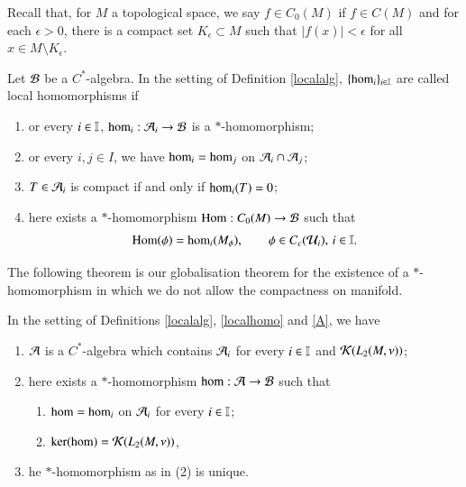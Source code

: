 \documentclass[leqno]{amsart}
\begin{document}
	Recall that, for $M$ a topological space, we say $f\in C_0(M)$ if $f\in C(M)$ and for each $\epsilon>0$, there is a compact set $K_{\epsilon}\subset M$ such that $|f(x)|<\epsilon$ for all $x\in M\setminus K_{\epsilon}$.
	
	\begin{definition}\label{localhomo}
		Let ${\mathcal B}$ be a $C^*$-algebra. In the setting of Definition \ref{localalg}, $\{{\rm hom}_i\}_{i\in\mathbb I}$ are called local homomorphisms if
		\begin{enumerate}[\rm(1)]
			\item {}or every $i\in\mathbb I$, ${\rm hom}_i:{\mathcal A}_i\to {\mathcal B}$ is a $*$-homomorphism;
			\item {}or every $i,j\in I$, we have ${\rm hom}_i={\rm hom}_j$ on ${\mathcal A}_i\cap{\mathcal A}_j$;
			\item $T\in{\mathcal A}_i$ is compact if and only if ${\rm hom}_i(T)=0$;
			\item {}here exists a $*$-homomorphism ${\rm Hom}:C_0(M)\to {\mathcal B}$ such that
			$${\rm Hom}(\phi)={\rm hom}_i(M_\phi),\qquad\phi\in C_c({\mathcal U}_i),\,i\in\mathbb I.$$
		\end{enumerate}
	\end{definition}
	
	
	The following theorem is our globalisation theorem for the existence of a $*$-homomorphism in which we do not allow the compactness on manifold.
	\begin{theorem}\label{globalisation}
		In the setting of Definitions \ref{localalg}, \ref{localhomo} and \ref{A}, we have
		\begin{enumerate}[\rm(1)]
			\item\label{Cstar algebra} ${\mathcal A}$ is a $C^*$-algebra which contains ${\mathcal A}_i$ for every $i\in\mathbb I$ and ${\mathcal K}(L_2(M,\nu))$;
			\item\label{star homomorphism} here exists a $*$-homomorphism ${\rm hom}:{\mathcal A}\to{\mathcal B}$ such that
			\begin{enumerate}
				\item ${\rm hom}={\rm hom}_i$ on ${\mathcal A}_i$ for every $i\in\mathbb I$;
				\item $\ker({\rm hom})={\mathcal K}(L_2(M,\nu))$,
			\end{enumerate}
			\item\label{star homomorphism unique} he $*$-homomorphism as in (2) is unique.
		\end{enumerate}
	\end{theorem}
	
\end{document}
